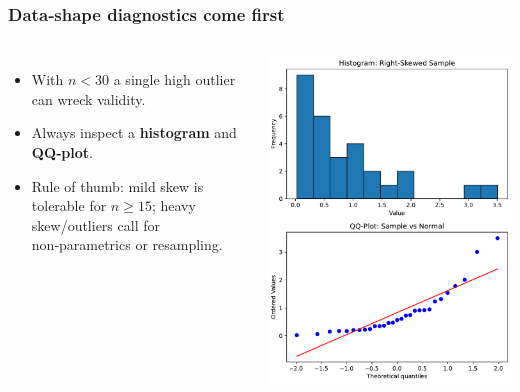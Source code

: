 \documentclass[handout]{beamer}
\begin{document}
\begin{frame}
\frametitle{Data‐shape diagnostics come first}
\vspace{-0.7em}
\begin{columns}
\begin{itemize}
  \item With \(n<30\) a single high outlier can wreck validity.
  \item Always inspect a \textbf{histogram} and \textbf{QQ‑plot}.
  \item Rule of thumb: mild skew is tolerable for \(n\ge 15\); heavy skew/outliers call for non‑parametrics or resampling.
\end{itemize}
\includegraphics[width=\textwidth]{Figures/qq_example.pdf}
\end{columns}
\end{frame}
\end{document}
